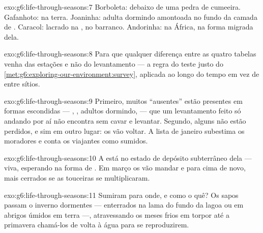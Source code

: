 \begin{solution}{exo:g6:life-through-seasons:7}
Borboleta:  debaixo de uma pedra de cumeeira. Gafanhoto:
 na terra. Joaninha: adulta dormindo amontoada no fundo da camada
de . Caracol: lacrado na , no barranco. Andorinha: na
África, na forma migrada dela.
\end{solution}

\begin{solution}{exo:g6:life-through-seasons:8}
Para que qualquer diferença entre as quatro tabelas venha das
estações e não do levantamento --- a regra do teste justo do
\cref{met:g6:exploring-our-environment:survey}, aplicada ao longo do
tempo em vez de entre sítios.
\end{solution}

\begin{solution}{exo:g6:life-through-seasons:9}
Primeiro, muitos ``ausentes'' estão presentes em formas escondidas
--- , , adultos dormindo,  --- que um levantamento
feito só andando por aí não encontra sem cavar e levantar. Segundo,
alguns não estão perdidos, e sim em outro lugar: os  vão
voltar. A lista de janeiro subestima os moradores e conta os
viajantes como sumidos.
\end{solution}

\begin{solution}{exo:g6:life-through-seasons:10}
A  está no estado de depósito subterrâneo dela --- viva,
esperando na forma de . Em março os  vão mandar  e
 para cima de novo, mais cerrados se as touceiras se
multiplicaram.
\end{solution}

\begin{solution}{exo:g6:life-through-seasons:11}
Sumiram para onde, e como o quê? Os sapos passam o inverno dormentes
--- enterrados na lama do fundo da lagoa ou em abrigos úmidos em terra
---, atravessando os meses frios em torpor até a primavera chamá-los
de volta à água para se reproduzirem.
\end{solution}

